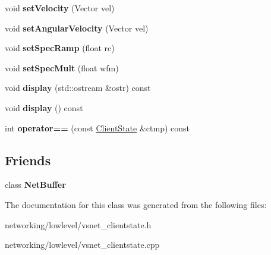 \begin{DoxyCompactItemize}
\item 
void {\bfseries set\+Velocity} (Vector vel)\hypertarget{classClientState_a6b4bd861a417fee756fd288af2fae981}{}\label{classClientState_a6b4bd861a417fee756fd288af2fae981}

\item 
void {\bfseries set\+Angular\+Velocity} (Vector vel)\hypertarget{classClientState_a78c96a8cf3ffa6f58e7ca6b75bf61e2b}{}\label{classClientState_a78c96a8cf3ffa6f58e7ca6b75bf61e2b}

\item 
void {\bfseries set\+Spec\+Ramp} (float rc)\hypertarget{classClientState_a56187e4ed07588f62f3a250188003819}{}\label{classClientState_a56187e4ed07588f62f3a250188003819}

\item 
void {\bfseries set\+Spec\+Mult} (float wfm)\hypertarget{classClientState_a0b2bb7fd9df8ded4001d28f18fd1074a}{}\label{classClientState_a0b2bb7fd9df8ded4001d28f18fd1074a}

\item 
void {\bfseries display} (std\+::ostream \&ostr) const \hypertarget{classClientState_ac7821e2ba472cf53b83fb38b83623072}{}\label{classClientState_ac7821e2ba472cf53b83fb38b83623072}

\item 
void {\bfseries display} () const \hypertarget{classClientState_a8cc9648db9a7e72bd344c1c53fc27367}{}\label{classClientState_a8cc9648db9a7e72bd344c1c53fc27367}

\item 
int {\bfseries operator==} (const \hyperlink{classClientState}{Client\+State} \&ctmp) const \hypertarget{classClientState_a0a197f19dfe55a571de8ce18e789bc2e}{}\label{classClientState_a0a197f19dfe55a571de8ce18e789bc2e}

\end{DoxyCompactItemize}
\subsection*{Friends}
\begin{DoxyCompactItemize}
\item 
class {\bfseries Net\+Buffer}\hypertarget{classClientState_a5fa9dc68a18506d711ae309eb2b89feb}{}\label{classClientState_a5fa9dc68a18506d711ae309eb2b89feb}

\end{DoxyCompactItemize}


The documentation for this class was generated from the following files\+:\begin{DoxyCompactItemize}
\item 
networking/lowlevel/vsnet\+\_\+clientstate.\+h\item 
networking/lowlevel/vsnet\+\_\+clientstate.\+cpp\end{DoxyCompactItemize}
